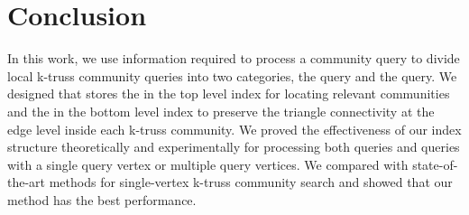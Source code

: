 \section{Conclusion}
\label{conclusion}

In this work, we use information required to process a community query to divide local k-truss community queries into two categories, the \toplevelprob{} query and the \bottomlevelprob{} query. We designed \twolevelindex{} that stores the \treeindex{} in the top level index for locating relevant communities and the \inducedgraph{} in the bottom level index to preserve the triangle connectivity at the edge level inside each k-truss community. 
We proved the effectiveness of our index structure theoretically and experimentally for processing both \toplevelprob{} queries and \bottomlevelprob{} queries with a single query vertex or multiple query vertices. We compared with state-of-the-art methods for single-vertex k-truss community search and showed that our method has the best performance. %
